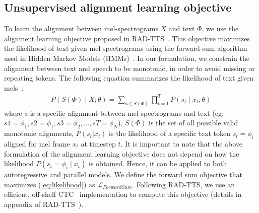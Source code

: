 \subsection{Unsupervised alignment learning objective}
\label{sec:ctc_objective}
To learn the alignment between mel-spectrograms $X$ and text $\Phi$, we use the alignment learning objective proposed in RAD-TTS~\cite{rad_tts}. This objective maximizes the likelihood of text given mel-spectrograms using the forward-sum algorithm used in Hidden Markov
Models (HMMs)~\cite{Rabiner89-ATO}. In our formulation, we constrain the alignment between text and speech to be monotonic, in order to avoid missing or repeating tokens. The following equation 
summarizes the likelihood of text given mels~\cite{rad_tts}:
%
%
\begin{align}\label{eq:likelihood}
 P \left(S(\Phi) \mid X;\theta\right) = \sum_{\mathbf{s} \in S(\Phi)} {\prod_{t=1}^{T}{P(s_t \mid x_t;\theta)} }
\end{align}
%
where $s$ is a specific alignment between mel-spectrograms and text (eg: $s1 = \phi_1, s2 = \phi_1, s3 = \phi_2, \ldots, sT = \phi_N$), $S(\Phi)$ is the set of all possible valid monotonic alignments, $ P(s_t | x_t)$ is the likelihood of a specific text token $s_t = \phi_i$ aligned for mel frame $x_t$ at timestep $t$. It is important to note that the above formulation of the alignment learning objective does not depend on how the likelihood  $P(s_t = \phi_i \mid x_t)$ is obtained. Hence, it can be applied to both autoregressive and parallel models. We define the forward sum objective that maximizes (\ref{eq:likelihood}) as $\mathcal{L}_{\mathit{ForwardSum}}$. 
Following RAD-TTS, we use an efficient, off-shelf CTC~\cite{ctc_icml2006} implementation to compute this objective (details in appendix of RAD-TTS~\cite{rad_tts}). 

